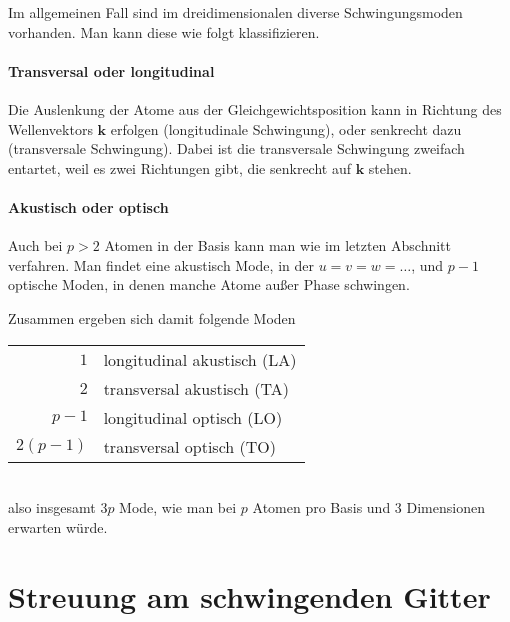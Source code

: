 Im allgemeinen Fall sind im dreidimensionalen diverse Schwingungsmoden vorhanden. Man kann diese wie folgt klassifizieren.

\paragraph{Transversal oder longitudinal} Die Auslenkung der Atome aus der Gleichgewichtsposition kann in Richtung des Wellenvektors $\mathbf{k}$ erfolgen (longitudinale Schwingung), oder senkrecht dazu (transversale Schwingung). Dabei ist die transversale Schwingung zweifach entartet, weil es zwei Richtungen gibt, die senkrecht auf $\mathbf{k}$ stehen.


\paragraph{Akustisch  oder optisch} Auch bei $p > 2$  Atomen in der Basis kann man wie im letzten Abschnitt verfahren. Man findet eine akustisch Mode, in der $u = v = w = \dots$, und $p -1$ optische Moden, in denen manche Atome außer Phase schwingen.

Zusammen ergeben sich damit folgende Moden \\
\begin{tabular}{rl}
$1$ & longitudinal akustisch (LA)\\
$2$ & transversal akustisch (TA) \\
$p-1$ & longitudinal optisch (LO) \\
$2(p-1)$ & transversal optisch (TO) \\
\end{tabular} \\
also insgesamt $3p$ Mode, wie man bei $p$ Atomen pro Basis und 3 Dimensionen erwarten würde.






\section{Streuung am schwingenden Gitter}

